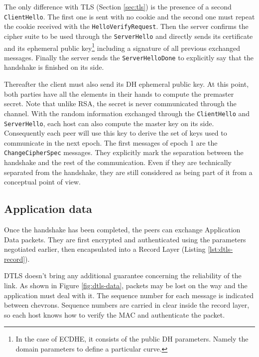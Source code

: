 The only difference with TLS (Section \ref{sec:tls}) is the presence of a second \texttt{ClientHello}. The first one is sent with no cookie and the second one must repeat the cookie received with the \texttt{HelloVerifyRequest}. Then the server confirms the cipher suite to be used through the \texttt{ServerHello} and directly sends its certificate and its ephemeral public key\footnote{In the case of ECDHE, it consists of the public DH parameters. Namely the domain parameters to define a particular curve.} including a signature of all previous exchanged messages. Finally the server sends the \texttt{ServerHelloDone} to explicitly say that the handshake is finished on its side.

Thereafter the client must also send its DH ephemeral public key. At this point, both parties have all the elements in their hands to compute the premaster secret. Note that unlike RSA, the secret is never communicated through the channel. With the random information exchanged through the \texttt{ClientHello} and \texttt{ServerHello}, each host can also compute the master key on its side. Consequently each peer will use this key to derive the set of keys used to communicate in the next epoch. The first messages of epoch 1 are the \texttt{ChangeCipherSpec} messages. They explicitly mark the separation between the handshake and the rest of the communication. Even if they are technically separated from the handshake, they are still considered as being part of it from a conceptual point of view.


\subsection{Application data}

Once the handshake has been completed, the peers can exchange Application Data packets. They are first encrypted and authenticated using the parameters negotiated earlier, then encapsulated into a Record Layer (Listing \ref{lst:dtls-record}).

DTLS doesn't bring any additional guarantee concerning the reliability of the link. As shown in Figure \ref{fig:dtls-data}, packets may be lost on the way and the application must deal with it. The sequence number for each message is indicated between chevrons. Sequence numbers are carried in clear inside the record layer, so each host knows how to verify the MAC and authenticate the packet.

